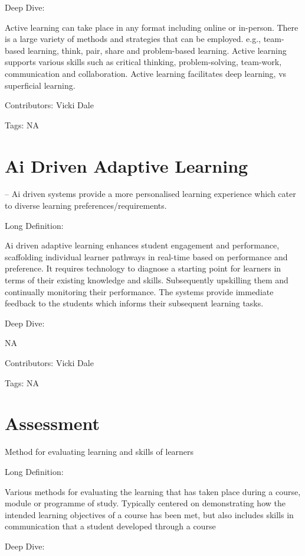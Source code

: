 \documentclass[
  letterpaper,
  DIV=11,
  numbers=noendperiod]{scrreprt}
\begin{document}
Deep Dive:

Active learning can take place in any format including online or
in-person. There is a large variety of methods and strategies that can
be employed. e.g., team-based learning, think, pair, share and
problem-based learning. Active learning supports various skills such as
critical thinking, problem-solving, team-work, communication and
collaboration. Active learning facilitates deep learning, vs superficial
learning.

Contributors: Vicki Dale

Tags: NA

\section{Ai Driven Adaptive Learning}\label{ai-driven-adaptive-learning}

-- Ai driven systems provide a more personalised learning experience
which cater to diverse learning preferences/requirements.

Long Definition:

Ai driven adaptive learning enhances student engagement and performance,
scaffolding individual learner pathways in real-time based on
performance and preference. It requires technology to diagnose a
starting point for learners in terms of their existing knowledge and
skills. Subsequently upskilling them and continually monitoring their
performance. The systems provide immediate feedback to the students
which informs their subsequent learning tasks.

Deep Dive:

NA

Contributors: Vicki Dale

Tags: NA

\section{Assessment}\label{assessment}

Method for evaluating learning and skills of learners

Long Definition:

Various methods for evaluating the learning that has taken place during
a course, module or programme of study. Typically centered on
demonstrating how the intended learning objectives of a course has been
met, but also includes skills in communication that a student developed
through a course

Deep Dive:
\end{document}
